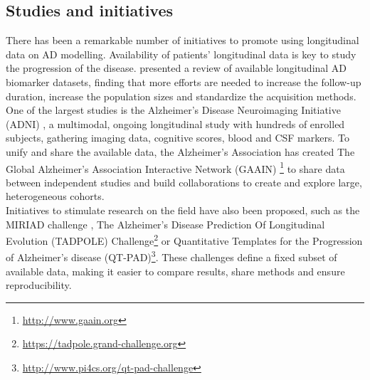 
\subsection*{Studies and initiatives} 
\label{biomarkers:studies}

There has been a remarkable number of initiatives to promote using longitudinal data on AD modelling. Availability of patients' longitudinal data is key to study the progression of the disease. \cite{Lawrence2017} presented a review of available longitudinal AD biomarker datasets, finding that more efforts are needed to increase the follow-up duration, increase the population sizes and standardize the acquisition methods. One of the largest studies is the Alzheimer's Disease Neuroimaging Initiative (ADNI) \cite{Mueller2005}, a multimodal, ongoing longitudinal study with hundreds of enrolled subjects, gathering imaging data, cognitive scores, blood and CSF markers. To unify and share the available data, the Alzheimer's Association has created The Global Alzheimer’s Association Interactive Network (GAAIN) \footnote{\url{http://www.gaain.org}} to share data between independent studies and build collaborations to create and explore large, heterogeneous cohorts. \\

Initiatives to stimulate research on the field have also been proposed, such as the MIRIAD challenge \cite{miriad}, The Alzheimer's Disease Prediction Of Longitudinal Evolution (TADPOLE) Challenge\footnote{\url{https://tadpole.grand-challenge.org}} or Quantitative Templates for the Progression of Alzheimer’s disease (QT-PAD)\footnote{\url{http://www.pi4cs.org/qt-pad-challenge}}. These challenges define a fixed subset of available data, making it easier to compare results, share methods and ensure reproducibility. \\

